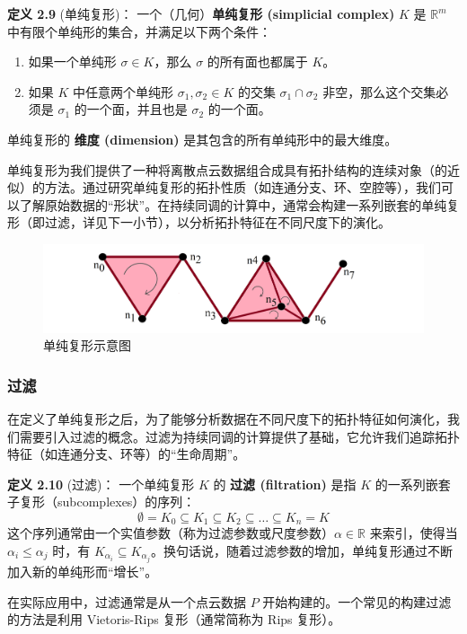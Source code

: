 \textbf{定义 2.9} (单纯复形)\cite{zomorodian2004computing}：
一个（几何）\textbf{单纯复形 (simplicial complex)} $K$ 是 $\mathbb{R}^m$ 中有限个单纯形的集合，并满足以下两个条件：
\begin{enumerate}
    \item 如果一个单纯形 $\sigma \in K$，那么 $\sigma$ 的所有面也都属于 $K$。
    \item 如果 $K$ 中任意两个单纯形 $\sigma_1, \sigma_2 \in K$ 的交集 $\sigma_1 \cap \sigma_2$ 非空，那么这个交集必须是 $\sigma_1$ 的一个面，并且也是 $\sigma_2$ 的一个面。
\end{enumerate}
单纯复形的 \textbf{维度 (dimension)} 是其包含的所有单纯形中的最大维度。

单纯复形为我们提供了一种将离散点云数据组合成具有拓扑结构的连续对象（的近似）的方法。通过研究单纯复形的拓扑性质（如连通分支、环、空腔等），我们可以了解原始数据的“形状”。在持续同调的计算中，通常会构建一系列嵌套的单纯复形（即过滤，详见下一小节），以分析拓扑特征在不同尺度下的演化。
\begin{figure}[thbp!]
    \centering
    \includegraphics[width=.9\textwidth]{figure/单形集合.png}
    \caption{单纯复形示意图}
\end{figure}
\subsubsection{过滤}
在定义了单纯复形之后，为了能够分析数据在不同尺度下的拓扑特征如何演化，我们需要引入过滤的概念。过滤为持续同调的计算提供了基础，它允许我们追踪拓扑特征（如连通分支、环等）的“生命周期”。

\textbf{定义 2.10} (过滤)：
一个单纯复形 $K$ 的 \textbf{过滤 (filtration)} 是指 $K$ 的一系列嵌套子复形（subcomplexes）的序列：
$$ \emptyset = K_0 \subseteq K_1 \subseteq K_2 \subseteq \dots \subseteq K_n = K $$
这个序列通常由一个实值参数（称为过滤参数或尺度参数）$\alpha \in \mathbb{R}$ 来索引，使得当 $\alpha_i \le \alpha_j$ 时，有 $K_{\alpha_i} \subseteq K_{\alpha_j}$。换句话说，随着过滤参数的增加，单纯复形通过不断加入新的单纯形而“增长”。

在实际应用中，过滤通常是从一个点云数据 $P$ 开始构建的。一个常见的构建过滤的方法是利用 Vietoris-Rips 复形（通常简称为 Rips 复形）。

